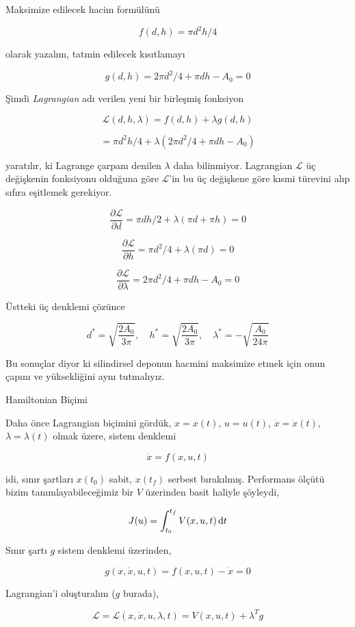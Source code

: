\documentclass[12pt,fleqn]{article}\usepackage{../../common}
\begin{document}
Maksimize edilecek hacim formülünü 

$$
f(d,h) = \pi d^2 h / 4
$$

olarak yazalım, tatmin edilecek kısıtlamayı

$$
g(d,h) = 2 \pi d^2 / 4 + \pi d h - A_0 = 0
$$

Şimdi {\em Lagrangian} adı verilen yeni bir birleşmiş fonksiyon 

$$
\mathcal{L}(d,h,\lambda) = f(d,h) + \lambda g(d,h) 
$$

$$
= \pi d^2 h / 4 + \lambda (2 \pi d^2 / 4 + \pi d h - A_0 )
$$

yaratılır, ki Lagrange çarpanı denilen $\lambda$ daha
bilinmiyor. Lagrangian $\mathcal{L}$ üç değişkenin fonksiyonu olduğuna göre
$\mathcal{L}$'in bu üç değişkene göre kısmi türevini alıp sıfıra eşitlemek
gerekiyor. 

$$
\frac{\partial \mathcal{L}}{\partial d} = \pi d h / 2 + \lambda (\pi d + \pi h) = 0
$$

$$
\frac{\partial \mathcal{L}}{\partial h} = \pi d^2 / 4 + \lambda (\pi d) = 0 
$$

$$
\frac{\partial \mathcal{L}}{\partial \lambda} = 2\pi d^2 / 4 + \pi d h - A_0 = 0
$$

Üstteki üç denklemi çözünce 

$$
d^* = \sqrt{\frac{2 A_0}{3 \pi}}, \quad
h^* = \sqrt{\frac{2 A_0}{3 \pi}}, \quad
\lambda^* = -\sqrt{\frac{A_0}{24 \pi}}
$$

Bu sonuçlar diyor ki silindirsel deponun hacmini maksimize etmek için onun
çapını ve yüksekliğini aynı tutmalıyız. 

Hamiltonian Biçimi 

Daha önce Lagrangian biçimini gördük, $x=x(t)$, $u=u(t)$,
$\dot{x}=\dot{x}(t)$, $\lambda=\lambda(t)$ olmak üzere, sistem denklemi

$$
\dot{x} = f(x, u, t)
$$

idi, sınır şartları $x(t_0)$ sabit, $x(t_f)$ serbest
bırakılmış. Performans ölçütü bizim tanımlayabileceğimiz bir $V$
üzerinden basit haliyle şöyleydi,

$$
J(u) = \int _{t_0}^{t_f} V(x, u, t) \,\mathrm{d} t
$$

Sınır şartı $g$ sistem denklemi üzerinden,

$$
g(x, \dot{x}, u, t) = f(x, u, t) - \dot{x} = 0
$$

Lagrangian'i oluşturalım ($g$ burada), 

$$
\mathcal{L} = \mathcal{L}( x, \dot{x}, u, \lambda, t) =
V( x, u, t) +  \lambda^T g 
$$
\end{document}
